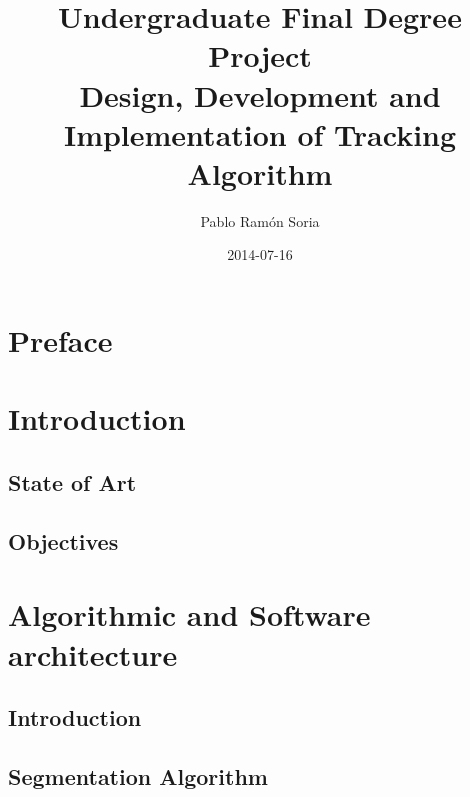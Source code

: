 \documentclass{book} %
\begin{document}
\frontmatter
\title{Undergraduate Final Degree Project \\ Design, Development and Implementation of Tracking Algorithm}
\author{Pablo Ram\'on Soria}
\date{2014-07-16}
\maketitle

\tableofcontents

\chapter{Preface}


\chapter{Introduction}
\section{State of Art}


\section{Objectives}


\mainmatter


\chapter{Algorithmic and Software architecture}
\section{Introduction}


\section{Segmentation Algorithm}

\end{document}
